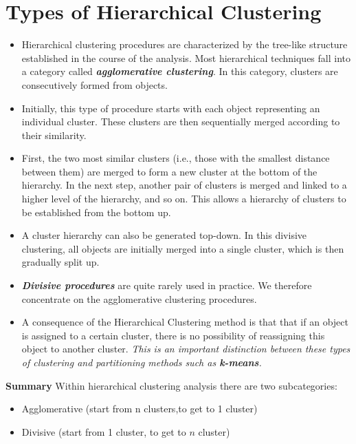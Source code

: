 \documentclass[RCluster.tex]{subfiles}
\begin{document}
\section{Types of Hierarchical Clustering}
\begin{itemize}
\item
Hierarchical clustering procedures are characterized by the tree-like structure
established in the course of the analysis. Most hierarchical techniques fall into a
category called \textbf{\textit{agglomerative clustering}}. In this category, clusters are consecutively
formed from objects. 
\item Initially, this type of procedure starts with each object
representing an individual cluster. These clusters are then sequentially merged
according to their similarity. 
\item First, the two most similar clusters (i.e., those with
the smallest distance between them) are merged to form a new cluster at the bottom
of the hierarchy. In the next step, another pair of clusters is merged and linked to a
higher level of the hierarchy, and so on. This allows a hierarchy of clusters to be
established from the bottom up.
\item A cluster hierarchy can also be generated top-down. In this divisive clustering,
all objects are initially merged into a single cluster, which is then gradually split up. 
\item \textbf{\textit{Divisive procedures}} are quite rarely used in practice. We therefore
concentrate on the agglomerative clustering procedures.
\item A consequence of the Hierarchical Clustering method is that that if an object is assigned
to a certain cluster, there is no possibility of reassigning this object to another
cluster.\textit{ This is an important distinction between these types of clustering and
partitioning methods such as \textbf{\textit{k-means}}.}
\end{itemize}
\noindent \textbf{Summary} Within hierarchical clustering analysis there are two subcategories: 
\begin{itemize}
\item Agglomerative (start from n clusters,to get to 1 cluster)
\item Divisive (start from 1 cluster, to get to $n$ cluster)
\end{itemize}
\newpage
\end{document}
